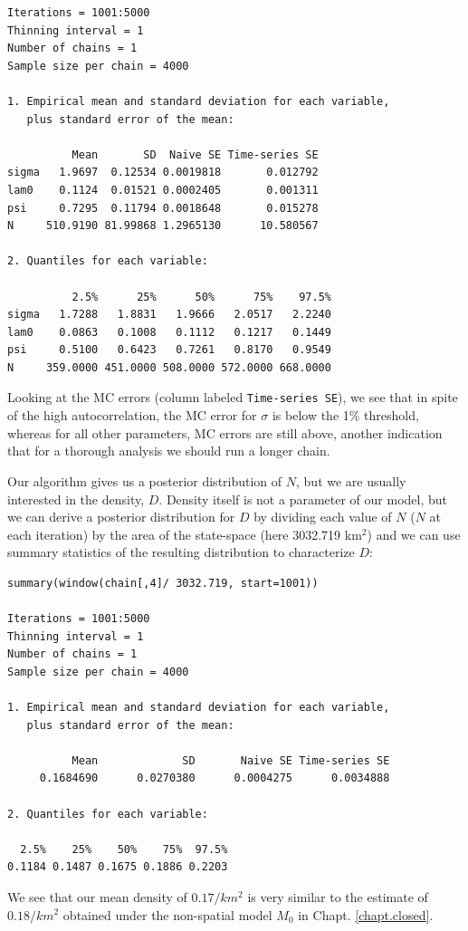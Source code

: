 {\small
\begin{verbatim}
Iterations = 1001:5000
Thinning interval = 1
Number of chains = 1
Sample size per chain = 4000

1. Empirical mean and standard deviation for each variable,
   plus standard error of the mean:

          Mean       SD  Naive SE Time-series SE
sigma   1.9697  0.12534 0.0019818       0.012792
lam0    0.1124  0.01521 0.0002405       0.001311
psi     0.7295  0.11794 0.0018648       0.015278
N     510.9190 81.99868 1.2965130      10.580567

2. Quantiles for each variable:

          2.5%      25%      50%      75%    97.5%
sigma   1.7288   1.8831   1.9666   2.0517   2.2240
lam0    0.0863   0.1008   0.1112   0.1217   0.1449
psi     0.5100   0.6423   0.7261   0.8170   0.9549
N     359.0000 451.0000 508.0000 572.0000 668.0000
\end{verbatim}
}

Looking at the MC errors (column labeled \mbox{\tt Time-series SE}),
we see that in spite of the high autocorrelation, the MC error for
$\sigma$ is below the 1\% threshold, whereas for all other parameters,
MC errors are still above, another indication that for a thorough
analysis we should run a longer chain.

Our algorithm gives us a posterior distribution of $N$, but we are usually
interested in the density, $D$. Density itself is not a parameter of our
model, but we can derive a posterior distribution for $D$ by dividing
each value of $N$ ($N$ at each iteration) by the area of the state-space
 (here 3032.719 km$^2$) and we can use summary statistics of the
 resulting distribution to characterize $D$:
\begin{verbatim}
summary(window(chain[,4]/ 3032.719, start=1001))

Iterations = 1001:5000
Thinning interval = 1
Number of chains = 1
Sample size per chain = 4000

1. Empirical mean and standard deviation for each variable,
   plus standard error of the mean:

          Mean             SD       Naive SE Time-series SE
     0.1684690      0.0270380      0.0004275      0.0034888

2. Quantiles for each variable:

  2.5%    25%    50%    75%  97.5%
0.1184 0.1487 0.1675 0.1886 0.2203
\end{verbatim}
We see that our mean density of $0.17/km^2$ is very similar to the estimate of $0.18/km^2$ obtained under the non-spatial model $M_0$ in Chapt. \ref{chapt.closed}.


